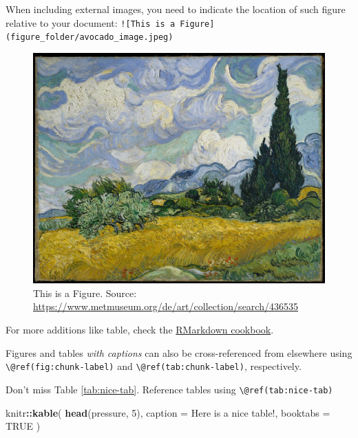 \documentclass[
]{book}
\newenvironment{Shaded}{\begin{snugshade}}{\end{snugshade}}
\newcommand{\AttributeTok}[1]{\textcolor[rgb]{0.13,0.29,0.53}{#1}}
\newcommand{\ConstantTok}[1]{\textcolor[rgb]{0.56,0.35,0.01}{#1}}
\newcommand{\DecValTok}[1]{\textcolor[rgb]{0.00,0.00,0.81}{#1}}
\newcommand{\FunctionTok}[1]{\textcolor[rgb]{0.13,0.29,0.53}{\textbf{#1}}}
\newcommand{\NormalTok}[1]{#1}
\newcommand{\SpecialCharTok}[1]{\textcolor[rgb]{0.81,0.36,0.00}{\textbf{#1}}}
\newcommand{\StringTok}[1]{\textcolor[rgb]{0.31,0.60,0.02}{#1}}
\begin{document}
When including external images, you need to indicate the location of such figure relative to your document: \texttt{!{[}This\ is\ a\ Figure{]}(figure\_folder/avocado\_image.jpeg)}

\begin{figure}
\centering
\includegraphics{figures/vangogh.jpeg}
\caption{This is a Figure. Source: \url{https://www.metmuseum.org/de/art/collection/search/436535}}
\end{figure}

For more additions like table, check the \href{https://bookdown.org/yihui/rmarkdown-cookbook/tables.html}{RMarkdown cookbook}.

Figures and tables \emph{with captions} can also be cross-referenced from elsewhere using \texttt{\textbackslash{}@ref(fig:chunk-label)} and \texttt{\textbackslash{}@ref(tab:chunk-label)}, respectively.

Don't miss Table \ref{tab:nice-tab}. Reference tables using \texttt{\textbackslash{}@ref(tab:nice-tab)}

\begin{Shaded}
\begin{Highlighting}[]
\NormalTok{knitr}\SpecialCharTok{::}\FunctionTok{kable}\NormalTok{(}
  \FunctionTok{head}\NormalTok{(pressure, }\DecValTok{5}\NormalTok{), }\AttributeTok{caption =} \StringTok{\textquotesingle{}Here is a nice table!\textquotesingle{}}\NormalTok{,}
  \AttributeTok{booktabs =} \ConstantTok{TRUE}
\NormalTok{)}
\end{Highlighting}
\end{Shaded}
\end{document}
